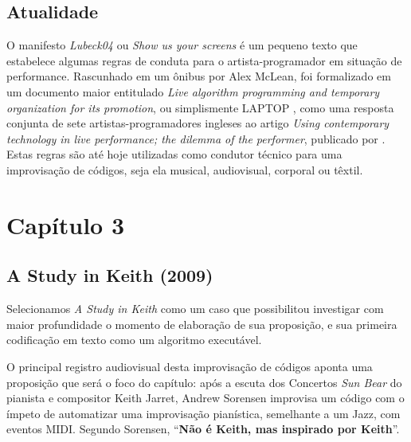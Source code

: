 \subsection*{Atualidade}

O manifesto \emph{Lubeck04} ou \emph{Show us your screens} é um pequeno texto que estabelece algumas regras de conduta para o artista-programador em situação de performance. Rascunhado em um ônibus por Alex McLean, foi formalizado em um documento maior entitulado \emph{Live algorithm programming and temporary organization for its promotion}, ou simplismente LAPTOP \cite{ward_live_2004}, como uma resposta conjunta de sete artistas-programadores ingleses ao artigo \emph{Using contemporary technology in live performance; the dilemma of the
performer}, publicado por . Estas regras são até hoje utilizadas como condutor técnico para uma improvisação de códigos, seja ela musical, audiovisual, corporal ou têxtil.

\section*{Capítulo 3} 

\subsection*{A Study in Keith (2009)}

Selecionamos \emph{A Study in Keith} \cite{sorensen_keith_2009,sorensen_youtube_2014} como um caso que possibilitou investigar com maior profundidade o momento de elaboração de sua proposição, e sua primeira codificação em texto como um algoritmo executável.

O principal registro audiovisual desta improvisação de códigos aponta uma proposição que será o foco do capítulo: após a escuta dos Concertos \emph{Sun Bear} do pianista e compositor Keith Jarret, Andrew Sorensen improvisa um código com o ímpeto de automatizar uma improvisação pianística, semelhante a um Jazz, com eventos MIDI. Segundo Sorensen, ``\textbf{Não é Keith, mas inspirado por Keith}''.



